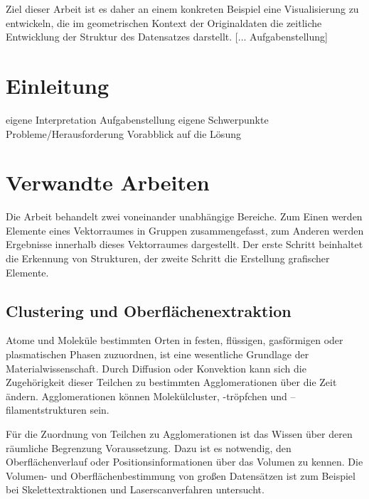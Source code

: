 Ziel dieser Arbeit ist es daher an einem konkreten Beispiel eine Visualisierung zu entwickeln, die im geometrischen Kontext der Originaldaten die zeitliche Entwicklung der Struktur des Datensatzes darstellt. [... Aufgabenstellung]

\chapter{Einleitung}

eigene Interpretation Aufgabenstellung
eigene Schwerpunkte
Probleme/Herausforderung
Vorabblick auf die Lösung

\chapter{Verwandte Arbeiten}

Die Arbeit behandelt zwei voneinander unabhängige Bereiche. Zum Einen werden Elemente eines Vektorraumes in Gruppen zusammengefasst, zum Anderen werden Ergebnisse innerhalb dieses Vektorraumes dargestellt. Der erste Schritt beinhaltet die Erkennung von Strukturen, der zweite Schritt die Erstellung grafischer Elemente.

\section{Clustering und Oberflächenextraktion}

Atome und Moleküle bestimmten Orten in festen, flüssigen, gasförmigen oder plasmatischen Phasen zuzuordnen, ist eine wesentliche Grundlage der Materialwissenschaft. %
Durch Diffusion oder Konvektion kann sich die Zugehörigkeit dieser Teilchen zu bestimmten Agglomerationen über die Zeit ändern. Agglomerationen können Molekülcluster, -tröpfchen und –filamentstrukturen sein. 

Für die Zuordnung von Teilchen zu Agglomerationen ist das Wissen über deren räumliche Begrenzung Voraussetzung. Dazu ist es notwendig, den Oberflächenverlauf oder Positionsinformationen über das Volumen zu kennen. Die Volumen- und Oberflächenbestimmung von großen Datensätzen ist zum Beispiel bei Skelettextraktionen und Laserscanverfahren untersucht.

